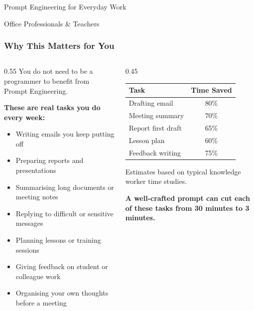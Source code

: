 \begin{frame}[fragile]\frametitle{}
\begin{center}
{\Large Prompt Engineering for Everyday Work}

\medskip
{\large Office Professionals \& Teachers}
\end{center}
\end{frame}


\begin{frame}[fragile]\frametitle{Why This Matters for You}

\begin{columns}
    \begin{column}[T]{0.55\linewidth}
    You do not need to be a programmer to benefit from Prompt Engineering.

    \medskip
    \textbf{These are real tasks you do every week:}
    \begin{itemize}
        \item Writing emails you keep putting off
        \item Preparing reports and presentations
        \item Summarising long documents or meeting notes
        \item Replying to difficult or sensitive messages
        \item Planning lessons or training sessions
        \item Giving feedback on student or colleague work
        \item Organising your own thoughts before a meeting
    \end{itemize}
    \end{column}
    \begin{column}[T]{0.45\linewidth}
    \begin{center}
    \renewcommand{\arraystretch}{1.4}
    \begin{tabular}{|l|c|}
    \hline
    \textbf{Task} & \textbf{Time Saved} \\
    \hline
    Drafting email & 80\% \\
    Meeting summary & 70\% \\
    Report first draft & 65\% \\
    Lesson plan & 60\% \\
    Feedback writing & 75\% \\
    \hline
    \end{tabular}
    \end{center}
    \medskip
    {\tiny Estimates based on typical knowledge worker time studies.}
	
	    \textbf{A well-crafted prompt can cut each of these tasks from 30 minutes to 3 minutes.}
    \end{column}
\end{columns}

\end{frame}


